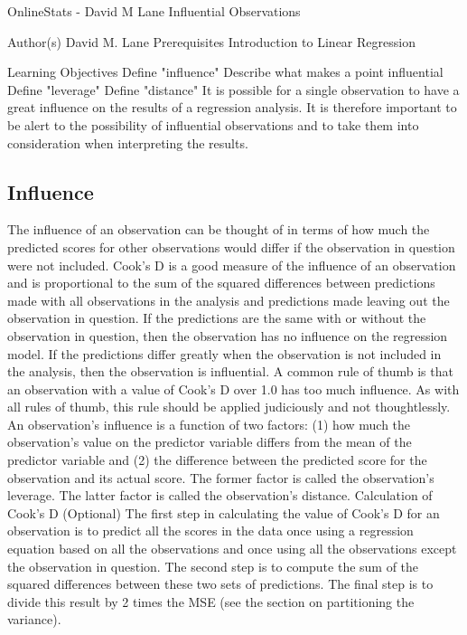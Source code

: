 OnlineStats - David M Lane
Influential Observations

Author(s)
David M. Lane
Prerequisites
Introduction to Linear Regression

Learning Objectives
Define "influence"
Describe what makes a point influential
Define "leverage"
Define "distance"
It is possible for a single observation to have a great influence on the results of a regression analysis. It is therefore important to be alert to the possibility of influential observations and to take them into consideration when interpreting the results.
\subsection*{Influence}
The influence of an observation can be thought of in terms of how much the predicted scores for other observations would differ if the observation in question were not included. Cook's D is a good measure of the influence of an observation and is proportional to the sum of the squared differences between predictions made with all observations in the analysis and predictions made leaving out the observation in question. If the predictions are the same with or without the observation in question, then the observation has no influence on the regression model. If the predictions differ greatly when the observation is not included in the analysis, then the observation is influential.
A common rule of thumb is that an observation with a value of Cook's D over 1.0 has too much influence. As with all rules of thumb, this rule should be applied judiciously and not thoughtlessly.
An observation's influence is a function of two factors: (1) how much the observation's value on the predictor variable differs from the mean of the predictor variable and (2) the difference between the predicted score for the observation and its actual score. The former factor is called the observation's leverage. The latter factor is called the observation's distance.
Calculation of Cook's D (Optional)
The first step in calculating the value of Cook's D for an observation is to predict all the scores in the data once using a regression equation based on all the observations and once using all the observations except the observation in question. The second step is to compute the sum of the squared differences between these two sets of predictions. The final step is to divide this result by 2 times the MSE (see the section on partitioning the variance).
